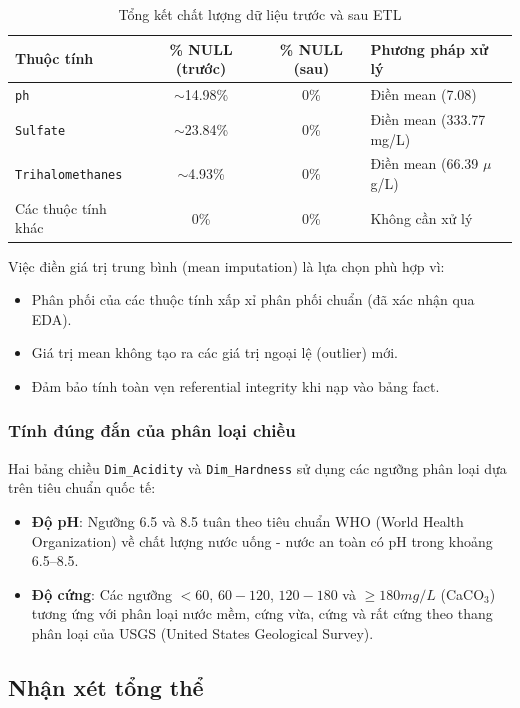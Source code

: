 \begin{table}[H]
\centering
\caption{Tổng kết chất lượng dữ liệu trước và sau ETL}
\label{tab:data_quality}
\begin{tabular}{lccl}
\hline
\textbf{Thuộc tính} & \textbf{\% NULL (trước)} & \textbf{\% NULL (sau)} & \textbf{Phương pháp xử lý} \\
\hline
\texttt{ph} & $\sim$14.98\% & 0\% & Điền mean (7.08) \\
\texttt{Sulfate} & $\sim$23.84\% & 0\% & Điền mean (333.77 mg/L) \\
\texttt{Trihalomethanes} & $\sim$4.93\% & 0\% & Điền mean (66.39 $\mu$g/L) \\
Các thuộc tính khác & 0\% & 0\% & Không cần xử lý \\
\hline
\end{tabular}
\end{table}

Việc điền giá trị trung bình (mean imputation) là lựa chọn phù hợp vì:
\begin{itemize}
    \item Phân phối của các thuộc tính xấp xỉ phân phối chuẩn (đã xác nhận qua EDA).
    \item Giá trị mean không tạo ra các giá trị ngoại lệ (outlier) mới.
    \item Đảm bảo tính toàn vẹn referential integrity khi nạp vào bảng fact.
\end{itemize}

\subsubsection{Tính đúng đắn của phân loại chiều}

Hai bảng chiều \texttt{Dim\_Acidity} và \texttt{Dim\_Hardness} sử dụng các ngưỡng phân loại dựa trên tiêu chuẩn quốc tế:

\begin{itemize}
    \item \textbf{Độ pH}: Ngưỡng 6.5 và 8.5 tuân theo tiêu chuẩn WHO (World Health Organization) về chất lượng nước uống - nước an toàn có pH trong khoảng 6.5--8.5.
    \item \textbf{Độ cứng}: Các ngưỡng $<$60, $60-120$, $120-180$ và $\geq180 mg/L$ (CaCO$_3$) tương ứng với phân loại nước mềm, cứng vừa, cứng và rất cứng theo thang phân loại của USGS (United States Geological Survey).
\end{itemize}

\subsection{Nhận xét tổng thể}


